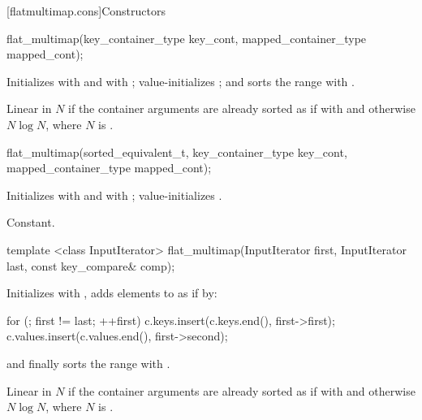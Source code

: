 \begin{codeblock}
\begin{codeblock}
\begin{codeblock}
\begin{addedblock}
[flatmultimap.cons]{Constructors}

%
\begin{itemdecl}
flat_multimap(key_container_type key_cont, mapped_container_type mapped_cont);
\end{itemdecl}

\begin{itemdescr}
\pnum
\effects Initializes  with  and
 with ; value-initializes
; and sorts the range  with
.

\pnum
\complexity
Linear in $N$ if the container arguments are already sorted as if
with  and otherwise $N \log N$, where $N$
is .
\end{itemdescr}

%
\begin{itemdecl}
flat_multimap(sorted_equivalent_t, key_container_type key_cont,
              mapped_container_type mapped_cont);
\end{itemdecl}

\begin{itemdescr}
\pnum
\effects Initializes  with
 and  with
; value-initializes .

\pnum
\complexity
Constant.
\end{itemdescr}

%
\begin{itemdecl}
template <class InputIterator>
  flat_multimap(InputIterator first, InputIterator last, const key_compare& comp);
\end{itemdecl}

\begin{itemdescr}
\pnum
\effects Initializes  with , adds elements to
 as if by:
\begin{codeblock}
for (; first != last; ++first) {
  c.keys.insert(c.keys.end(), first->first); 
  c.values.insert(c.values.end(), first->second); 
}
\end{codeblock}
and finally sorts the range  with .

\pnum
\complexity
Linear in $N$ if the container arguments are already sorted as if with
 and otherwise $N \log N$, where $N$ is
.
\end{itemdescr}


\end{addedblock}
\end{codeblock}
\end{codeblock}
\end{codeblock}
